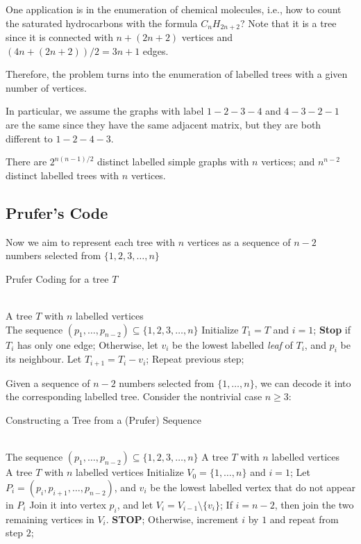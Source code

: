 One application is in the enumeration of chemical molecules, i.e., how to count the saturated hydrocarbons with the formula $C_nH_{2n+2}$?
Note that it is a tree since it is connected with $n+(2n+2)$ vertices and $(4n+(2n+2))/2=3n+1$ edges.

Therefore, the problem turns into the enumeration of labelled trees with a given number of vertices.

In particular, we assume the graphs with label $1-2-3-4$ and $4-3-2-1$ are the same since they have the same adjacent matrix, but they are both different to $1-2-4-3$.

\begin{theorem}
There are $2^{n(n-1)/2}$ distinct labelled simple graphs with $n$ vertices;
and $n^{n-2}$ distinct labelled trees with $n$ vertices.
\end{theorem}

\subsection{Prufer's Code}
Now we aim to represent each tree with $n$ vertices as a sequence of $n-2$ numbers selected from $\{1,2,3,\dots,n\}$

\begin{algorithm}[htb] 
\caption{Prufer Coding for a tree $T$} 
\label{alg:SM} 
\begin{algorithmic}[1] %
\REQUIRE ~~\\ %
A tree $T$ with $n$ labelled vertices
\ENSURE ~~\\ %
The sequence $(p_1,\dots,p_{n-2})\subseteq\{1,2,3,\dots,n\}$
\STATE 
Initialize $T_1=T$ and $i=1$;
\STATE
\textbf{Stop} if $T_i$ has only one edge;
\STATE
Otherwise, let $v_i$ be the lowest labelled \emph{leaf} of $T_i$, and $p_i$ be its neighbour.
Let $T_{i+1}=T_i-v_i$;
\STATE
Repeat previous step;
\end{algorithmic}
\end{algorithm}

Given a sequence of $n-2$ numbers selected from $\{1,\dots,n\}$, we can decode it into the corresponding labelled tree. Consider the nontrivial case $n\ge3$:

\begin{algorithm}[htb] 
\caption{Constructing a Tree from a (Prufer) Sequence} 
\label{alg:SM} 
\begin{algorithmic}[1] %
\REQUIRE ~~\\ %
The sequence $(p_1,\dots,p_{n-2})\subseteq\{1,2,3,\dots,n\}$
A tree $T$ with $n$ labelled vertices
\ENSURE ~~\\ %
A tree $T$ with $n$ labelled vertices
\STATE 
Initialize $V_0=\{1,\dots,n\}$ and $i=1$;
\STATE
Let $P_i = (p_i,p_{i+1},\dots,p_{n-2})$, and $v_i$ be the lowest labelled vertex that do not appear in $P_i$ Join it into vertex $p_i$, and let $V_i = V_{i-1}\setminus\{v_i\}$;
\STATE
If $i=n-2$, then join the two remaining vertices in $V_i$. \textbf{STOP};
\STATE
Otherwise, increment $i$ by $1$ and repeat from step $2$;
\end{algorithmic}
\end{algorithm}

